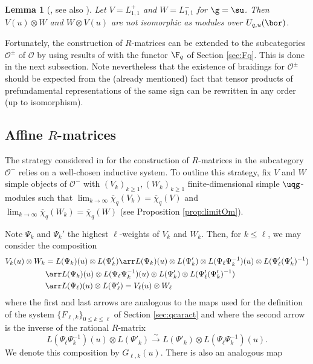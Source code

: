\documentclass[11pt]{amsart}
\newtheorem{lem}[theorem]{Lemma}
\theoremstyle{definition}
\theoremstyle{remark}
\numberwithin{equation}{section}
\begin{document}
\begin{lem}[{\cite[Example 5.2]{her}}, see also \cite{bjmst}]\label{lem:ProdTensLpm} Let $V = L_{1,1}^+$ and $W = L_{1,1}^-$ for $\g =\su$. Then $V(u)\otimes W$ and $W \otimes V(u)$ are not isomorphic as modules over $U_{q,u}(\bor)$. 
\end{lem}
Fortunately, the construction of $R$-matrices can be extended to the subcategories $\mathcal{O}^{\pm}$ of $\mathcal{O}$ by using results of \cite{her} with the functor $\F_q$ of Section \ref{sec:Fq}. This is done in the next subsection. Note nevertheless that the existence of braidings for $\mathcal{O}^{\pm}$ should be expected from the (already mentioned) fact that tensor products of prefundamental representations of the same sign can be rewritten in any order (up to isomorphism). 
\subsection{Affine $R$-matrices}\label{sec:ROm} The strategy considered in \cite{her} for the construction of $R$-matrices in the subcategory $\mathcal{O}^-$ relies on a well-chosen inductive system. To outline this strategy, fix $V$ and $W$ simple objects of $\mathcal{O}^-$ with $(V_k)_{k\geq 1},(W_k)_{k\geq 1}$ finite-dimensional simple $\uqg$-modules such that $\lim_{k\rightarrow \infty}\overline{\chi}_q(V_k) = \overline{\chi}_q(V)$ and $\lim_{k\rightarrow \infty}\overline{\chi}_q(W_k)=\overline{\chi}_q(W)$ (see Proposition \ref{prop:limitOm}).\par
Note $\Psi_k$ and $\Psi_k'$ the highest $\ell$-weights of $V_k$ and $W_k$. Then, for $k\leq \ell$, we may consider the composition 
\begin{align*}
V_k(u)\otimes W_k &= L(\Psi_k)(u)\otimes L(\Psi_k') \arr L(\Psi_k)(u)\otimes L(\Psi'_k)\otimes L(\Psi_{\ell}\Psi_k^{-1})(u)\otimes L(\Psi'_{\ell}(\Psi'_k)^{-1})\\
&\arr L(\Psi_k)(u)\otimes L(\Psi_{\ell}\Psi_k^{-1})(u)\otimes L(\Psi'_k) \otimes L(\Psi'_{\ell}(\Psi'_k)^{-1})\\
&\arr L(\Psi_{\ell})(u)\otimes L(\Psi'_{\ell}) = V_{\ell}(u)\otimes W_{\ell}
\end{align*}
where the first and last arrows are analogous to the maps used for the definition of the system $\{F_{\ell,k}\}_{0\leq k\leq \ell}$ of Section \ref{sec:qcaract} and where the second arrow is the inverse of the rational $R$-matrix 
$$ L(\Psi_{\ell}\Psi_k^{-1})(u) \otimes L(\Psi'_k) \xrightarrow{\sim} L(\Psi'_k)\otimes L(\Psi_{\ell}\Psi_k^{-1})(u). $$
We denote this composition by $G_{\ell,k}(u)$. There is also an analogous map
\end{document}
